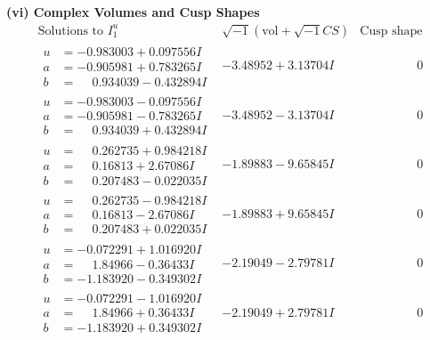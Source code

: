 \documentclass[1p]{elsarticle_modified}
\theoremstyle{definition}
\newcommand{\I}{\sqrt{-1}}
\begin{document}
\newpage\flushleft \textbf{(vi) Complex Volumes and Cusp Shapes}
$$\begin{array}{c|c|c}  
\text{Solutions to }I^u_{1}& \I (\text{vol} + \sqrt{-1}CS) & \text{Cusp shape}\\
 \hline 
\begin{aligned}
u &= -0.983003 + 0.097556 I \\
a &= -0.905981 + 0.783265 I \\
b &= \phantom{-}0.934039 - 0.432894 I\end{aligned}
 & -3.48952 + 3.13704 I & \phantom{-0.000000 } 0 \\ \hline\begin{aligned}
u &= -0.983003 - 0.097556 I \\
a &= -0.905981 - 0.783265 I \\
b &= \phantom{-}0.934039 + 0.432894 I\end{aligned}
 & -3.48952 - 3.13704 I & \phantom{-0.000000 } 0 \\ \hline\begin{aligned}
u &= \phantom{-}0.262735 + 0.984218 I \\
a &= \phantom{-}0.16813 + 2.67086 I \\
b &= \phantom{-}0.207483 - 0.022035 I\end{aligned}
 & -1.89883 - 9.65845 I & \phantom{-0.000000 } 0 \\ \hline\begin{aligned}
u &= \phantom{-}0.262735 - 0.984218 I \\
a &= \phantom{-}0.16813 - 2.67086 I \\
b &= \phantom{-}0.207483 + 0.022035 I\end{aligned}
 & -1.89883 + 9.65845 I & \phantom{-0.000000 } 0 \\ \hline\begin{aligned}
u &= -0.072291 + 1.016920 I \\
a &= \phantom{-}1.84966 - 0.36433 I \\
b &= -1.183920 - 0.349302 I\end{aligned}
 & -2.19049 - 2.79781 I & \phantom{-0.000000 } 0 \\ \hline\begin{aligned}
u &= -0.072291 - 1.016920 I \\
a &= \phantom{-}1.84966 + 0.36433 I \\
b &= -1.183920 + 0.349302 I\end{aligned}
 & -2.19049 + 2.79781 I & \phantom{-0.000000 } 0 \\ \hline\begin{aligned}

\end{aligned}
\end{array}$$
\end{document}
